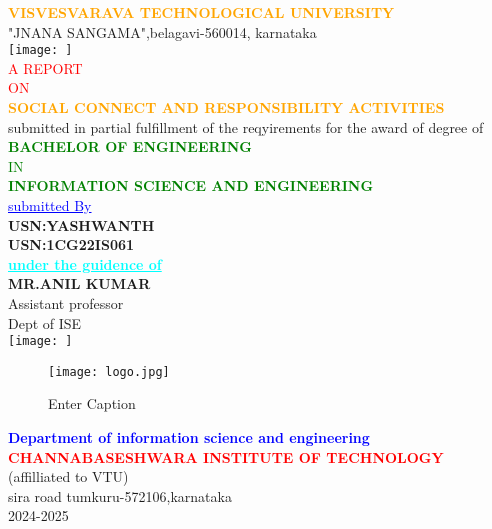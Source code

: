 \documentclass[12pt,a4paper]{article}
\begin{document}
\begin{center}
    \textcolor{orange}{\large\textbf{VISVESVARAVA TECHNOLOGICAL UNIVERSITY}}\\
    "JNANA SANGAMA",belagavi-560014, karnataka\\
    \vspace{2mm}
    \texttt{[image: ]}\\
    \vspace{2mm}
    \textcolor{red}{A REPORT}\\
    \textcolor{red}{ON}\\
    \textcolor{orange}{\textbf{SOCIAL CONNECT AND RESPONSIBILITY ACTIVITIES}}\\
    \small{submitted in partial fulfillment of the reqyirements for the award of degree of}\\
    \vspace{5mm}
    \textcolor{green}{\textbf{BACHELOR OF ENGINEERING}\\

IN\\
\textbf{INFORMATION SCIENCE AND ENGINEERING}}\\
\vspace{5mm}
\textcolor{blue}{\underline{submitted By}}\\
\textbf{USN:YASHWANTH}\\
\textbf{USN:1CG22IS061}\\
\vspace{5mm}
\textcolor{cyan}{\underline{{\textbf{under the guidence of }}}}\\
\large\textbf{MR.ANIL KUMAR}\\
Assistant professor\\
Dept of ISE\\

\centering\texttt{[image: ]}\\
\begin{figure}
    \centering
    \texttt{[image: logo.jpg]}
    \caption{Enter Caption}
    \label{fig:enter-label}
\end{figure}
\textcolor{blue}{\textbf{Department of information science and engineering }}\\
\textcolor{red}{\textbf{CHANNABASESHWARA INSTITUTE OF TECHNOLOGY}}\\
(affilliated to VTU)\\
sira road tumkuru-572106,karnataka\\
2024-2025
    
\end{center}
\end{document}
